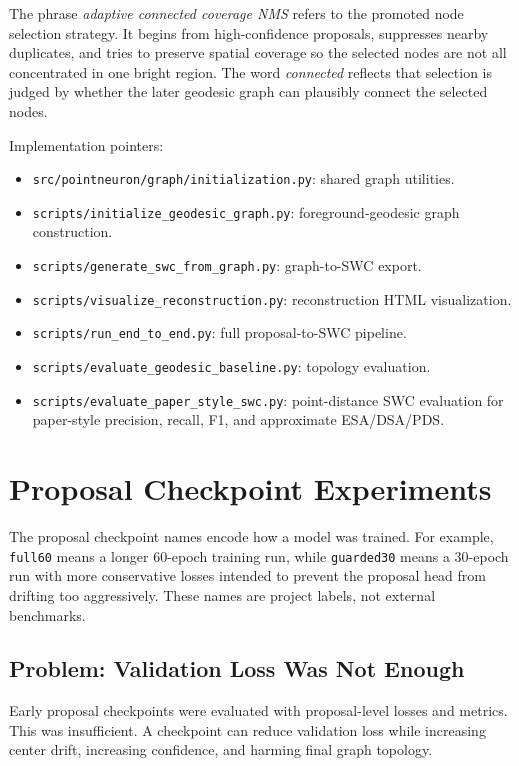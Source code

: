 \documentclass[11pt]{article}
\begin{document}
The phrase \emph{adaptive connected coverage NMS} refers to the promoted node
selection strategy. It begins from high-confidence proposals, suppresses nearby
duplicates, and tries to preserve spatial coverage so the selected nodes are not
all concentrated in one bright region. The word \emph{connected} reflects that
selection is judged by whether the later geodesic graph can plausibly connect
the selected nodes.

Implementation pointers:

\begin{itemize}
  \item \texttt{src/pointneuron/graph/initialization.py}: shared graph
  utilities.
  \item \texttt{scripts/initialize\_geodesic\_graph.py}: foreground-geodesic
  graph construction.
  \item \texttt{scripts/generate\_swc\_from\_graph.py}: graph-to-SWC export.
  \item \texttt{scripts/visualize\_reconstruction.py}: reconstruction HTML
  visualization.
  \item \texttt{scripts/run\_end\_to\_end.py}: full proposal-to-SWC pipeline.
  \item \texttt{scripts/evaluate\_geodesic\_baseline.py}: topology evaluation.
  \item \texttt{scripts/evaluate\_paper\_style\_swc.py}: point-distance SWC
  evaluation for paper-style precision, recall, F1, and approximate
  ESA/DSA/PDS.
\end{itemize}

\section{Proposal Checkpoint Experiments}

The proposal checkpoint names encode how a model was trained. For example,
\texttt{full60} means a longer 60-epoch training run, while
\texttt{guarded30} means a 30-epoch run with more conservative losses intended
to prevent the proposal head from drifting too aggressively. These names are
project labels, not external benchmarks.

\subsection{Problem: Validation Loss Was Not Enough}

Early proposal checkpoints were evaluated with proposal-level losses and
metrics. This was insufficient. A checkpoint can reduce validation loss while
increasing center drift, increasing confidence, and harming final graph
topology.
\end{document}
